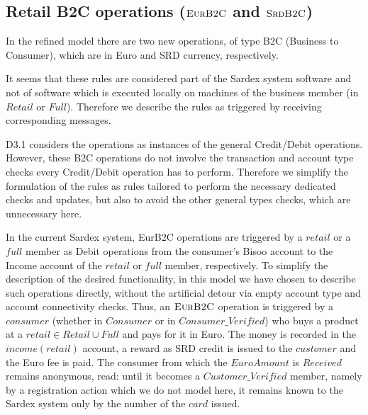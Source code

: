 \subsection{Retail B2C operations ($\hbox{\sc EurB2C}$ and $\hbox{\sc SrdB2C}$)}
\label{sect:eurob2c}

In the refined model there are two new operations, of type B2C (Business to 
Consumer), which are in Euro and SRD currency, respectively.

It seems that these rules are considered part of the Sardex system software and not of software which is executed locally on machines of the business member (in $Retail$ or $Full$). Therefore we describe the rules as triggered by receiving corresponding messages.

D3.1 considers the operations as instances of the general Credit/Debit operations. However, these B2C operations do not involve the transaction and account type checks every Credit/Debit operation has to perform. Therefore we simplify the formulation of the rules as rules tailored to perform the necessary dedicated checks and updates, but also to avoid the other general types checks, which are unnecessary here. 

In the current Sardex system, EurB2C operations are triggered by a $retail$ or a $full$ member as Debit operations from the consumer's Bisoo account to the Income account of the $retail$ or $full$ member, respectively. To simplify the description of the desired functionality, in this model we have chosen to describe such operations directly, without the artificial detour via empty account type and account connectivity checks. Thus, an $\hbox{\sc EurB2C}$ operation is triggered by a $consumer$ (whether in $Consumer$ or in $Consumer\_Verified$) who buys a product at a $retail \in Retail \cup Full$ and pays for it in Euro. The money is recorded in the $income(retail)$ account, a reward as SRD credit is issued to the $customer$ and the Euro fee is paid. The consumer from which the $EuroAmount$ is $Received$ remains anonymous, read: until it becomes a $Customer\_Verified$ member, namely by a registration action which we do not model here, it remains known to the Sardex system only by the number of the $card$ issued.

